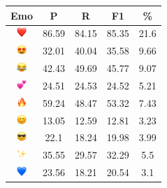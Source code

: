 \documentclass{article}
\begin{document}
\begin{table}
\centering
\begin{tabular}{|c|ccc|c|} \hline
\textbf{Emo} & \textbf{P} & \textbf{R} & \textbf{F1} & \textbf{\%} \\ \hline
\includegraphics[height=0.37cm,width=0.37cm]{img/red_heart.png} & 86.59 & 84.15 & 85.35 & 21.6\\ 
\includegraphics[height=0.37cm,width=0.37cm]{img/smiling_face_with_hearteyes.png} & 32.01 & 40.04 & 35.58 & 9.66\\ 
\includegraphics[height=0.37cm,width=0.37cm]{img/face_with_tears_of_joy.png} & 42.43 & 49.69 & 45.77 & 9.07\\ 
\includegraphics[height=0.37cm,width=0.37cm]{img/two_hearts.png} & 24.51 & 24.53 & 24.52 & 5.21\\ 
\includegraphics[height=0.37cm,width=0.37cm]{img/fire.png} & 59.24 & 48.47 & 53.32 & 7.43\\ 
\includegraphics[height=0.37cm,width=0.37cm]{img/smiling_face_with_smiling_eyes.png} & 13.05 & 12.59 & 12.81 & 3.23\\ 
\includegraphics[height=0.37cm,width=0.37cm]{img/smiling_face_with_sunglasses.png} & 22.1 & 18.24 & 19.98 & 3.99\\ 
\includegraphics[height=0.37cm,width=0.37cm]{img/sparkles.png} & 35.55 & 29.57 & 32.29 & 5.5\\ 
\includegraphics[height=0.37cm,width=0.37cm]{img/blue_heart.png} & 23.56 & 18.21 & 20.54 & 3.1\\ 

\end{tabular}
\end{table}
\end{document}
